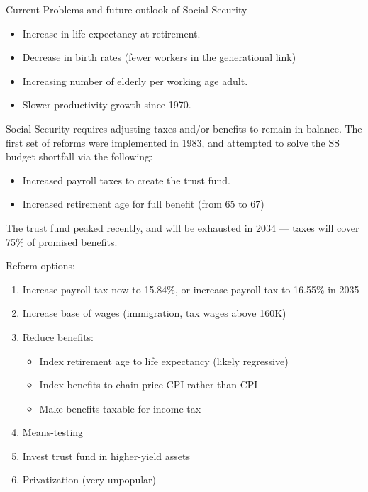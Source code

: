 \documentclass[10pt]{extarticle}
\begin{document}
  \begin{problem}{Current Problems and future outlook of Social Security}
    \begin{itemize}
      \item Increase in life expectancy at retirement.
      \item Decrease in birth rates (fewer workers in the generational link)
      \item Increasing number of elderly per working age adult.
      \item Slower productivity growth since 1970.
    \end{itemize}
    Social Security requires adjusting taxes and/or benefits to remain in balance. The first set of reforms were implemented in 1983, and attempted to solve the SS budget shortfall via the following:
    \begin{itemize}
      \item Increased payroll taxes to create the trust fund.
      \item Increased retirement age for full benefit (from 65 to 67)
    \end{itemize}
    The trust fund peaked recently, and will be exhausted in 2034 --- taxes will cover 75\% of promised benefits.\newline

    Reform options:
    \begin{enumerate}[(1)]
      \item Increase payroll tax now to 15.84\%, or increase payroll tax to 16.55\% in 2035
      \item Increase base of wages (immigration, tax wages above 160K)
      \item Reduce benefits:
        \begin{itemize}
          \item Index retirement age to life expectancy (likely regressive)
          \item Index benefits to chain-price CPI rather than CPI
          \item Make benefits taxable for income tax
        \end{itemize}
      \item Means-testing
      \item Invest trust fund in higher-yield assets
      \item Privatization (very unpopular)
    \end{enumerate}
  \end{problem}
\end{document}

